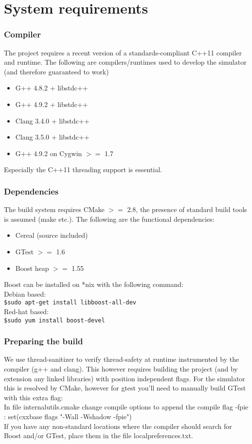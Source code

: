 \section{System requirements}
\subsubsection{Compiler}
The project requires a recent version of a standards-compliant C++11 compiler and runtime. The following are compilers/runtimes used to develop the simulator (and therefore guaranteed to work)
\begin{itemize}
  \item G++ 4.8.2 + libstdc++
  \item G++ 4.9.2 + libstdc++
  \item Clang 3.4.0 + libstdc++
  \item Clang 3.5.0 + libstdc++
  \item G++ 4.9.2 on Cygwin $>=$ 1.7
\end{itemize}
Especially the C++11 threading support is essential.
\subsubsection{Dependencies}
The build system requires CMake $>=$ 2.8, the presence of standard build tools is assumed (make etc.).
The following are the functional dependencies:
\begin{itemize}
  \item Cereal (source included)
  \item GTest $>=$ 1.6
  \item Boost heap $>=$ 1.55  
\end{itemize}
Boost can be installed on *nix with the following command:\\
Debian based:\\
\lstinline!$sudo apt-get install libboost-all-dev!\\
Red-hat based:\\
\lstinline!$sudo yum install boost-devel!\\
\subsubsection{Preparing the build}
We use thread-sanitizer to verify thread-safety at runtime instrumented by the compiler (g++ and clang). This however requires building the project (and by extension any linked libraries) with position independent flags. For the simulator this is resolved by CMake, however for gtest you'll need to manually build GTest with this extra flag:\\
In file internal\textunderscore utils.cmake change compile options to append the compile flag -fpie :
set(cxx\textunderscore base \textunderscore flags "-Wall -Wshadow -fpie")\\
If you have any non-standard locations where the compiler should search for Boost and/or GTest, place them in the file localpreferences.txt.\\
